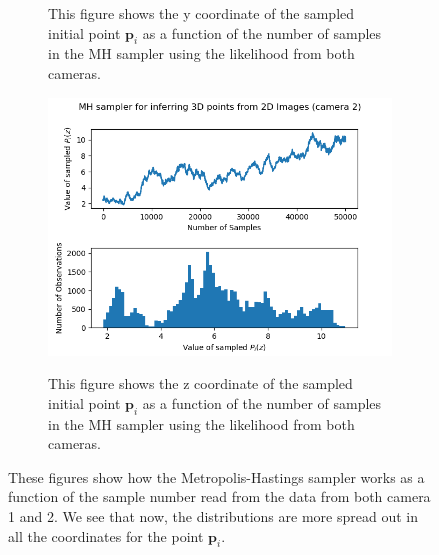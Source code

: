 \documentclass[10pt]{article}
\begin{document}
\begin{figure}[h!]
\begin{subfigure}[]{.320\textwidth}
  \label{fig:t3piy}
\caption{This figure shows the y coordinate of the sampled initial point $\mathbf{p}_i$ as a function of the number of samples in the MH sampler using the likelihood from both cameras.}
\end{subfigure}
\begin{subfigure}[]{.320\textwidth}
  \centering
  \includegraphics[width=1\linewidth]{figures/p_i_z12.png}
  \label{fig:t3pif}
\caption{This figure shows the z coordinate of the sampled initial point $\mathbf{p}_i$ as a function of the number of samples in the MH sampler using the likelihood from both cameras.}
\end{subfigure}
\caption{These figures show how the Metropolis-Hastings sampler works as a function of the sample number read from the data from both camera 1 and 2. We see that now, the distributions are more spread out in all the coordinates for the point $\mathbf{p}_i$.}

\end{figure}
\end{document}
